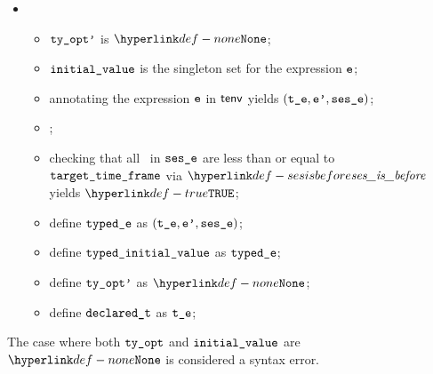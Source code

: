 \begin{itemize}
  \item {}
  \begin{itemize}
    \item $\tyoptp$ is $\None$;
    \item $\initialvalue$ is the singleton set for the expression $\ve$;
    \item annotating the expression $\ve$ in $\tenv$ yields $(\vte, \vep, \vsese)$\ProseOrTypeError;
    \item \Prosenoprecisionloss{$\vte$};
    \item checking that all \timeframesterm\ in $\vsese$ are less than or equal to \\
          $\vtargettimeframe$ via $\sesisbefore$ yields $\True$\ProseOrTypeError;
    \item define $\typede$ as $(\vte, \vep, \vsese)$;
    \item define $\typedinitialvalue$ as $\typede$;
    \item define $\tyoptp$ as $\None$;
    \item define $\declaredt$ as $\vte$;
  \end{itemize}
\end{itemize}
The case where both $\tyopt$ and $\initialvalue$ are $\None$ is considered a syntax error.

\FormallyParagraph
\begin{mathpar}
\end{mathpar}

